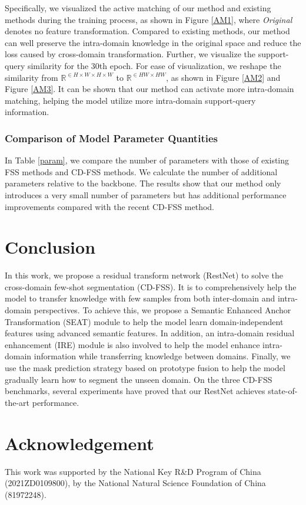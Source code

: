 \documentclass{bmvc2k}
\begin{document}
Specifically, we visualized the active matching of our method and existing methods \cite{lei2022cross} during the training process, as shown in Figure \ref{AM1}, where \textit{Original} denotes no feature transformation.
Compared to existing methods, our method can well preserve the intra-domain knowledge in the original space and reduce the loss caused by cross-domain transformation.
Further, we visualize the support-query similarity for the 30th epoch. 
For ease of visualization, we reshape the similarity from $\mathbb{R}^{\in H\times W\times H\times W}$ to $\mathbb{R}^{\in HW\times HW}$, as shown in Figure \ref{AM2} and Figure \ref{AM3}.
It can be shown that our method can activate more intra-domain matching, helping the model utilize more intra-domain support-query information.

\subsubsection{Comparison of Model Parameter Quantities}
In Table \ref{param}, we compare the number of parameters with those of existing FSS methods and CD-FSS methods.
We calculate the number of additional parameters relative to the backbone.
The results show that our method only introduces a very small number of parameters but has additional performance improvements compared with the recent CD-FSS method.
\begin{table}[t]
\caption{Comparison of the number of additional parameters of different methods.}
\centering
{}
\label{param}
\end{table}
\section{Conclusion}
In this work, we propose a residual transform network (RestNet) to solve the cross-domain few-shot segmentation (CD-FSS). 
It is to comprehensively help the model to transfer knowledge with few samples from both inter-domain and intra-domain perspectives. 
To achieve this, we propose a Semantic Enhanced Anchor Transformation (SEAT) module to help the model learn domain-independent features using advanced semantic features. 
In addition, an intra-domain residual enhancement (IRE) module is also involved to help the model enhance intra-domain information while transferring knowledge between domains.
Finally, we use the mask prediction strategy based on prototype fusion to help the model gradually learn how to segment the unseen domain. 
On the three CD-FSS benchmarks, several experiments have proved that our RestNet achieves state-of-the-art performance.

\section*{Acknowledgement}
This work was supported by the National Key R\&D Program of China (2021ZD0109800), by the National Natural Science Foundation of China (81972248).




\end{document}
